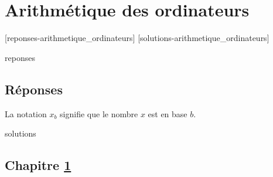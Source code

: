 \chapter{Arithmétique des ordinateurs}
\label{chap:ordinateurs}


[reponses-arithmetique_ordinateurs]
[solutions-arithmetique_ordinateurs]

\begin{Filesave}{reponses}
\bigskip
\section*{Réponses}

\noindent
La notation $x_{b}$ signifie que le nombre $x$ est en base $b$.

\end{Filesave}

\begin{Filesave}{solutions}
\section*{Chapitre \ref{chap:ordinateurs}}

\end{Filesave}


